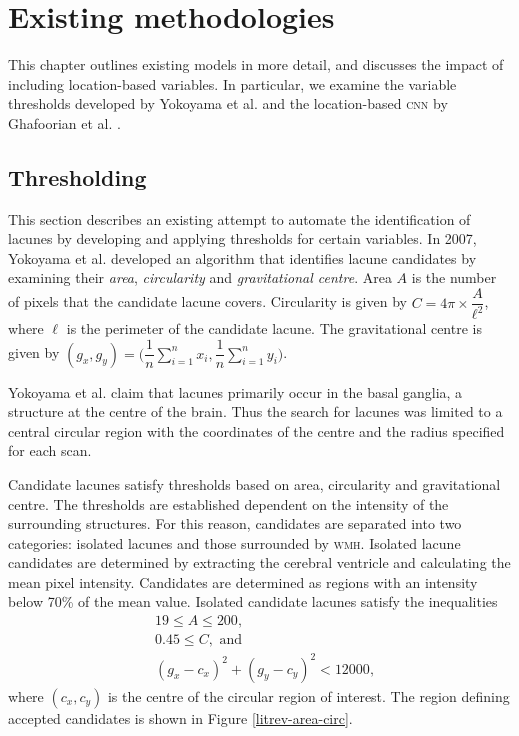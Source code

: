 %
%

\chapter{Existing methodologies}\label{litrev}

This chapter outlines existing models in more detail, and discusses the impact of including location-based variables. In particular, we examine the variable thresholds developed by Yokoyama et al. \cite{Yokoyama2007} and the location-based \textsc{cnn} by Ghafoorian et al. \cite{GhafoorianM.2017Dml3}.

\section{Thresholding}\label{litrev-threshold}

This section describes an existing attempt to automate the identification of lacunes by developing and applying thresholds for certain variables. In 2007, Yokoyama et al. \cite{Yokoyama2007} developed an algorithm that identifies lacune candidates by examining their \textit{area}, \textit{circularity} and \textit{gravitational centre}. Area $A$ is the number of pixels that the candidate lacune covers. Circularity is given by $C = 4\pi\times\dfrac{A}{\ell^2}$, where $\ell$ is the perimeter of the candidate lacune. The gravitational centre is given by $(g_x, g_y) = \bigg(\dfrac{1}{n}\sum_{i=1}^nx_i, \dfrac{1}{n}\sum_{i=1}^ny_i\bigg)$.

Yokoyama et al. \cite{Yokoyama2007} claim that lacunes primarily occur in the basal ganglia, a structure at the centre of the brain. Thus the search for lacunes was limited to a central circular region with the coordinates of the centre and the radius specified for each scan.

Candidate lacunes satisfy thresholds based on area, circularity and gravitational centre. The thresholds are established dependent on the intensity of the surrounding structures. For this reason, candidates are separated into two categories: isolated lacunes and those surrounded by \textsc{wmh}. Isolated lacune candidates are determined by extracting the cerebral ventricle and calculating the mean pixel intensity. Candidates are determined as regions with an intensity below 70\% of the mean value. Isolated candidate lacunes satisfy the inequalities
\begin{align*}
	& 19 \le A \le 200, \\
	& 0.45 \le C,\text{ and } \\
	& (g_x - c_x)^2 + (g_y - c_y)^2 < 12000,
\end{align*}
where $(c_x, c_y)$ is the centre of the circular region of interest. The region defining accepted candidates is shown in Figure \ref{litrev-area-circ}.

